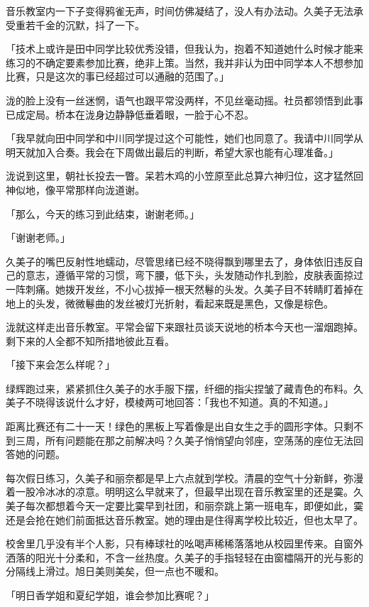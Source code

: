 \documentclass[UTF8]{ctexart}
\begin{document}
    音乐教室内一下子变得鸦雀无声，时间仿佛凝结了，没人有办法动。久美子无法承受重若千金的沉默，抖了一下。 

    「技术上或许是田中同学比较优秀没错，但我认为，抱着不知道她什么时候才能来练习的不确定要素参加比赛，绝非上策。当然，我并非认为田中同学本人不想参加比赛，只是这次的事已经超过可以通融的范围了。」 

    泷的脸上没有一丝迷惘，语气也跟平常没两样，不见丝毫动摇。社员都领悟到此事已成定局。桥本在泷身边静静低垂着眼，一脸于心不忍。 

    「我早就向田中同学和中川同学提过这个可能性，她们也同意了。我请中川同学从明天就加入合奏。我会在下周做出最后的判断，希望大家也能有心理准备。」 

    泷说到这里，朝社长投去一瞥。呆若木鸡的小笠原至此总算六神归位，这才猛然回神似地，像平常那样向泷道谢。 

    「那么，今天的练习到此结束，谢谢老师。」 

    「谢谢老师。」 

    久美子的嘴巴反射性地蠕动，尽管思绪已经不晓得飘到哪里去了，身体依旧违反自己的意志，遵循平常的习惯，弯下腰，低下头，头发随动作扎到脸，皮肤表面掠过一阵刺痛。她拨开发丝，不小心拔掉一根天然鬈的头发。久美子目不转睛盯着掉在地上的头发，微微鬈曲的发丝被灯光折射，看起来既是黑色，又像是棕色。 

    泷就这样走出音乐教室。平常会留下来跟社员谈天说地的桥本今天也一溜烟跑掉。剩下来的人全都不知所措地彼此互看。 

    「接下来会怎么样呢？」 

    绿辉跑过来，紧紧抓住久美子的水手服下摆，纤细的指尖捏皱了藏青色的布料。久美子不晓得该说什么才好，模棱两可地回答：「我也不知道。真的不知道。」 

    距离比赛还有二十一天！绿色的黑板上写着像是出自女生之手的圆形字体。只剩不到三周，所有问题能在那之前解决吗？久美子悄悄望向邻座，空荡荡的座位无法回答她的问题。 

    每次假日练习，久美子和丽奈都是早上六点就到学校。清晨的空气十分新鲜，弥漫着一股冷冰冰的凉意。明明这么早就来了，但最早出现在音乐教室里的还是霙。久美子每次都想着今天一定要比霙早到社团，和丽奈跳上第一班电车，即便如此，霙还是会抢在她们前面抵达音乐教室。她的理由是住得离学校比较近，但也太早了。 

    校舍里几乎没有半个人影，只有棒球社的吆喝声稀稀落落地从校园里传来。自窗外洒落的阳光十分柔和，不含一丝热度。久美子的手指轻轻在由窗櫺隔开的光与影的分隔线上滑过。旭日美则美矣，但一点也不暖和。 

    「明日香学姐和夏纪学姐，谁会参加比赛呢？」 
\end{document}
